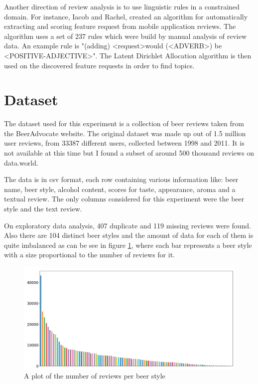 \documentclass[12pt]{article}
\begin{document}
	Another direction of review analysis is to use linguistic rules in a constrained domain. For instance, Iacob and Rachel\cite{MARA}, created an algorithm for automatically extracting and scoring feature request from mobile application reviews. The algorithm uses a set of 237 rules which were build by manual analysis of review data. An example rule is "(adding) \textless request\textgreater would (\textless ADVERB\textgreater) be \textless POSITIVE-ADJECTIVE\textgreater". The Latent Dirichlet Allocation algorithm is then used on the discovered feature requests in order to find topics.
	
	\section{Dataset}
	The dataset used for this experiment is a collection of beer reviews taken from the BeerAdvocate website. The original dataset was made up out of 1.5 million user reviews, from 33387 different users, collected between 1998 and 2011. It is not available at this time but I found a subset of around 500 thousand reviews on data.world\cite{BeerAdvocateData}. 
	
	The data is in csv format, each row containing various information like: beer name, beer style, alcohol content, scores for taste, appearance, aroma and a textual review. The only columns considered for this experiment were the beer style and the text review.
	
	On exploratory data analysis, 407 duplicate and 119 missing reviews were found. Also there are 104 distinct beer styles and the amount of data for each of them is quite imbalanced as can be see in figure \ref{fig:initialDistribution}, where each bar represents a beer style with a size proportional to the number of reviews for it.
	
	\begin{figure}[h]
		\includegraphics[width=\linewidth]{resources/InitialDistribution.png}
		\caption{A plot of the number of reviews per beer style}
		\label{fig:initialDistribution}
	\end{figure}
\end{document}
